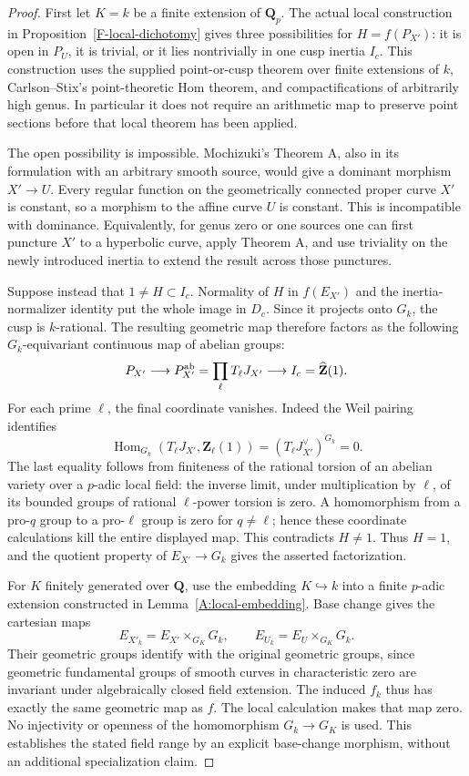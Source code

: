 \documentclass[11pt,oneside]{article}
\begin{document}
\begin{proof}
First let $K=k$ be a finite extension of $\mathbf Q_p$. The actual
local construction in Proposition~\ref{F-local-dichotomy} gives
three possibilities for $H=f(P_{X'})$: it is open in $P_U$, it is
trivial, or it lies nontrivially in one cusp inertia $I_c$.
This construction uses the supplied point-or-cusp theorem over
finite extensions of $k$, Carlson--Stix's point-theoretic
Hom theorem, and compactifications of arbitrarily high genus.
In particular it does not require an arithmetic map to preserve
point sections before that local theorem has been applied.

The open possibility is impossible. Mochizuki's Theorem A, also
in its formulation with an arbitrary smooth source, would give a
dominant morphism $X'\to U$. Every regular function on the
geometrically connected proper curve $X'$ is constant, so a
morphism to the affine curve $U$ is constant. This is incompatible
with dominance. Equivalently, for genus zero or one sources one
can first puncture $X'$ to a hyperbolic curve, apply Theorem A,
and use triviality on the newly introduced inertia to extend the
result across those punctures.

Suppose instead that $1\ne H\subset I_c$. Normality of $H$ in
$f(E_{X'})$ and the inertia-normalizer identity put the whole
image in $D_c$. Since it projects onto $G_k$, the cusp is
$k$-rational. The resulting geometric map therefore factors as
the following $G_k$-equivariant continuous map of abelian groups:
\[
 P_{X'}\longrightarrow P_{X'}^{\rm ab}
   =\prod_\ell T_\ell J_{X'}
 \longrightarrow I_c=\widehat{\mathbf Z}(1).
\]
For each prime $\ell$, the final coordinate vanishes. Indeed the
Weil pairing identifies
\[
 \operatorname{Hom}_{G_k}(T_\ell J_{X'},\mathbf Z_\ell(1))
       =(T_\ell J_{X'}^\vee)^{G_k}=0.
\]
The last equality follows from finiteness of the rational torsion
of an abelian variety over a $p$-adic local field: the inverse
limit, under multiplication by $\ell$, of its bounded groups
of rational $\ell$-power torsion is zero. A homomorphism from a
pro-$q$ group to a pro-$\ell$ group is zero for $q\ne\ell$;
hence these coordinate calculations kill the entire displayed
map. This contradicts $H\ne1$. Thus $H=1$, and the quotient
property of $E_{X'}\to G_k$ gives the asserted factorization.

For $K$ finitely generated over $\mathbf Q$, use the embedding
$K\hookrightarrow k$ into a finite $p$-adic extension constructed
in Lemma~\ref{A:local-embedding}. Base change gives the cartesian
maps
\[
 E_{X'_k}=E_{X'}\times_{G_K}G_k,
 \qquad E_{U_k}=E_U\times_{G_K}G_k.
\]
Their geometric groups identify with the original geometric
groups, since geometric fundamental groups of smooth curves in
characteristic zero are invariant under algebraically closed
field extension. The induced $f_k$ thus has exactly the same
geometric map as $f$. The local calculation makes that map zero.
No injectivity or openness of the homomorphism $G_k\to G_K$
is used. This establishes the stated field range by an explicit
base-change morphism, without an additional specialization claim.
\end{proof}
\end{document}

